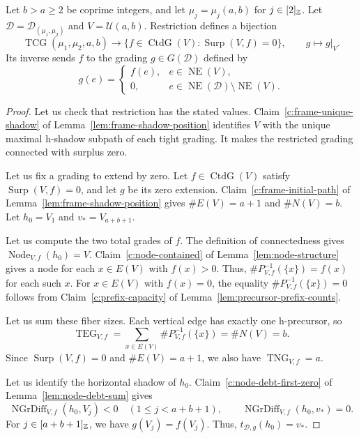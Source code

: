 \begin{lemma}\label{lem:frame-grading-bijection}
Let $b>a\ge2$ be coprime integers, and let $\mu_j=\mu_j(a,b)$ for $j\in[2]_{\mathbb Z}$.
Let $\mathcal D=\mathcal D_{(\mu_1,\mu_2)}$ and $V=\mathcal U(a,b)$.
Restriction defines a bijection
\[
 \operatorname{TCG}(\mu_1,\mu_2,a,b)
 \longrightarrow
 \{f\in\operatorname{CtdG}(V):\operatorname{Surp}(V,f)=0\},
 \qquad g\longmapsto g|_V.
\]
Its inverse sends $f$ to the grading $g\in G(\mathcal D)$ defined by
\[
 g(e)=
 \begin{cases}
 f(e),&e\in\operatorname{NE}(V),\\
 0,&e\in\operatorname{NE}(\mathcal D)\setminus\operatorname{NE}(V).
 \end{cases}
\]
\end{lemma}
\begin{proof}
Let us check that restriction has the stated values.
Claim~\ref{c:frame-unique-shadow} of Lemma~\ref{lem:frame-shadow-position} identifies $V$ with the unique maximal h-shadow subpath of each tight grading.
It makes the restricted grading connected with surplus zero.

Let us fix a grading to extend by zero.
Let $f\in\operatorname{CtdG}(V)$ satisfy $\operatorname{Surp}(V,f)=0$, and let $g$ be its zero extension.
Claim~\ref{c:frame-initial-path} of Lemma~\ref{lem:frame-shadow-position} gives $\#E(V)=a+1$ and $\#N(V)=b$.
Let $h_0=V_1$ and $v_*=V_{a+b+1}$.

Let us compute the two total grades of $f$.
The definition of connectedness gives $\operatorname{Node}_{V,f}(h_0)=V$.
Claim~\ref{c:node-contained} of Lemma~\ref{lem:node-structure} gives a node for each $x\in E(V)$ with $f(x)>0$.
Thus, $\#P_{V,f}^{-1}(\{x\})=f(x)$ for each such $x$.
For $x\in E(V)$ with $f(x)=0$, the equality $\#P_{V,f}^{-1}(\{x\})=0$ follows from Claim~\ref{c:prefix-capacity} of Lemma~\ref{lem:precursor-prefix-counts}.

Let us sum these fiber sizes.
Each vertical edge has exactly one h-precursor, so
\[
 \operatorname{TEG}_{V,f}
 =\sum_{x\in E(V)}\#P_{V,f}^{-1}(\{x\})
 =\#N(V)=b.
\]
Since $\operatorname{Surp}(V,f)=0$ and $\#E(V)=a+1$, we also have $\operatorname{TNG}_{V,f}=a$.

Let us identify the horizontal shadow of $h_0$.
Claim~\ref{c:node-debt-first-zero} of Lemma~\ref{lem:node-debt-sum} gives
\[
 \operatorname{NGrDiff}_{V,f}(h_0,V_j)<0
 \quad(1\le j<a+b+1),\qquad
 \operatorname{NGrDiff}_{V,f}(h_0,v_*)=0.
\]
For $j\in[a+b+1]_{\mathbb Z}$, we have $g(V_j)=f(V_j)$.
Thus, $t_{\mathcal D,g}(h_0)=v_*$.


\end{proof}
